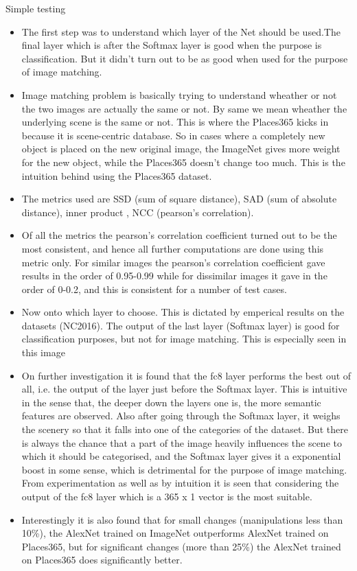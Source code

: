 \documentclass{article}
\begin{document}
Simple testing

\begin{itemize}
\item The first step was to understand which layer of the Net should be used.The final layer which is after the Softmax layer is good when the purpose is classification. But it didn't turn out to be as good when used for the purpose of image matching.
\item Image matching problem is basically trying to understand wheather or not the two images are actually the same or not. By same we mean wheather the underlying scene is the same or not. This is where the Places365 kicks in because it is scene-centric database. So in cases where a completely new object is placed on the new original image, the ImageNet gives more weight for the new object, while the Places365 doesn't change too much. This is the intuition behind using the Places365 dataset.
\item The metrics used are SSD (sum of square distance), SAD (sum of absolute distance), inner product , NCC (pearson's correlation).
\item Of all the metrics the pearson's correlation coefficient turned out to be the most consistent, and hence all further computations are done using this metric only. For similar images the pearson's correlation coefficient gave results in the order of 0.95-0.99 while for dissimilar images it gave in the order of 0-0.2, and this is consistent for a number of test cases.
\item Now onto which layer to choose. This is dictated by emperical results on the datasets (NC2016). The output of the last layer (Softmax layer) is good for classification purposes, but not for image matching. This is especially seen in this image %
\item On further investigation it is found that the fc8 layer performs the best out of all, i.e. the output of the layer just before the Softmax layer. This is intuitive in the sense that, the deeper down the layers one is, the more semantic features are observed. Also after going through the Softmax layer, it weighs the scenery so that it falls into one of the categories of the dataset. But there is always the chance that a part of the image heavily influences the scene to which it should be categorised, and the Softmax layer gives it a exponential boost in some sense, which is detrimental for the purpose of image matching. From experimentation as well as by intuition it is seen that considering the output of the fc8 layer which is a 365 x 1 vector is the most suitable.
\item Interestingly it is also found that for small changes (manipulations less than 10\%), the AlexNet trained on ImageNet outperforms AlexNet trained on Places365, but for significant changes (more than 25\%) the AlexNet trained on Places365 does significantly better.
\end{itemize}
\end{document}
